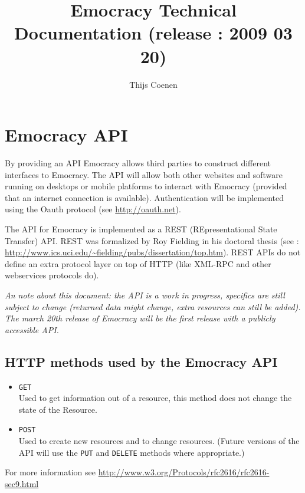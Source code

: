 \documentclass[a4paper]{report}
\author{Thijs Coenen}
\title{Emocracy Technical Documentation (release : 2009 03 20)}
\begin{document}
\maketitle
\tableofcontents
\chapter{Emocracy API}
By providing an API Emocracy allows third parties to construct different 
interfaces to Emocracy. The API will allow both other websites and 
software running on desktops or mobile platforms to interact with Emocracy 
(provided that an internet connection is available). Authentication will be 
implemented using the Oauth protocol (see \url{http://oauth.net}).

The API for Emocracy is implemented as a REST (REpresentational State Transfer) 
API. REST was formalized by Roy Fielding in his doctoral thesis (see : 
\url{http://www.ics.uci.edu/\~fielding/pubs/dissertation/top.htm}). REST APIs do
not define an extra protocol layer on top of HTTP (like XML-RPC and other 
webservices protocols do).

\textsl{An note about this document: the API is a work in progress, specifics are still 
subject to change (returned data might change, extra resources can still be 
added). The march 20th release of Emocracy will be the first release with a 
publicly accessible API.}


\section{HTTP methods used by the Emocracy API}
\begin{itemize}
    \item{\texttt{GET}\\
    Used to get information out of a resource, this method does not change the 
    state of the Resource.}
    \item{\texttt{POST}\\
    Used to create new resources and to change resources. (Future versions
    of the API will use the \texttt{PUT} and \texttt{DELETE} methods where 
    appropriate.)}
\end{itemize}
For more information see \url{http://www.w3.org/Protocols/rfc2616/rfc2616-sec9.html}
\end{document}
